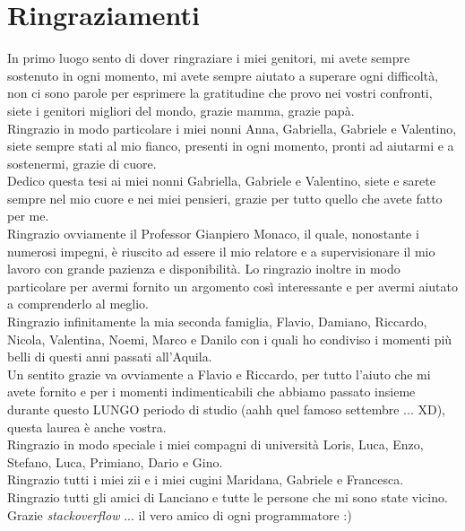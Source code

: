 \chapter*{Ringraziamenti}
\justify
In primo luogo sento di dover ringraziare i miei genitori, mi avete sempre sostenuto in ogni momento, mi avete sempre aiutato a superare ogni difficoltà, non ci sono parole per esprimere la gratitudine che provo nei vostri confronti, siete i genitori migliori del mondo, grazie mamma, grazie papà.\\
Ringrazio in modo particolare i miei nonni Anna, Gabriella, Gabriele e Valentino, siete sempre stati al mio fianco, presenti in ogni momento, pronti ad aiutarmi e a sostenermi, grazie di cuore.\\
Dedico questa tesi ai miei nonni Gabriella, Gabriele e Valentino, siete e sarete sempre nel mio cuore e nei miei pensieri, grazie per tutto quello che avete fatto per me.\\
Ringrazio ovviamente il Professor Gianpiero Monaco, il quale, nonostante i numerosi impegni, è riuscito ad essere il mio relatore e a supervisionare il mio lavoro con grande pazienza e disponibilità. Lo ringrazio inoltre in modo particolare per avermi fornito un argomento così interessante e per avermi aiutato a comprenderlo al meglio.\\
Ringrazio infinitamente la mia seconda famiglia, Flavio, Damiano, Riccardo, Nicola, Valentina, Noemi, Marco e Danilo con i quali ho condiviso i momenti più belli di questi anni passati all'Aquila.\\
Un sentito grazie va ovviamente a Flavio e Riccardo, per tutto l'aiuto che mi avete fornito e per i momenti indimenticabili che abbiamo passato insieme durante questo LUNGO periodo di studio (aahh quel famoso settembre ... XD), questa laurea è anche vostra.\\
Ringrazio in modo speciale i miei compagni di università Loris, Luca, Enzo, Stefano, Luca, Primiano, Dario e Gino.\\
Ringrazio tutti i miei zii e i miei cugini Maridana, Gabriele e Francesca.\\
Ringrazio tutti gli amici di Lanciano e tutte le persone che mi sono state vicino.\\
Grazie \textit{stackoverflow} ... il vero amico di ogni programmatore :)